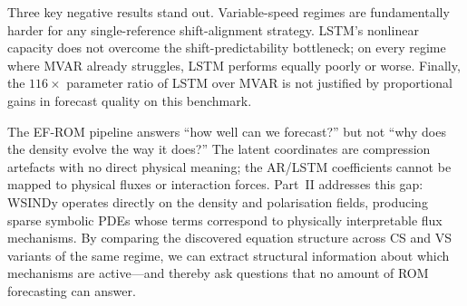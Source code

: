 Three key negative results stand out.
Variable-speed regimes are fundamentally harder for any
single-reference shift-alignment strategy.
LSTM's nonlinear capacity does not overcome the shift-predictability
bottleneck; on every regime where MVAR already struggles, LSTM
performs equally poorly or worse.
Finally, the $116\times$ parameter ratio of LSTM over MVAR
is not justified by proportional gains
in forecast quality on this benchmark.

\label{sec:ch7_transition}
The EF-ROM pipeline answers ``how well can we forecast?'' but not ``why
does the density evolve the way it does?''  The latent coordinates are
compression artefacts with no direct physical meaning; the AR/LSTM
coefficients cannot be mapped to physical fluxes or interaction forces.
Part~II addresses this gap: WSINDy operates directly on the density and
polarisation fields, producing sparse symbolic PDEs whose terms correspond
to physically interpretable flux mechanisms.  By comparing the discovered
equation structure across CS and VS variants of the same regime, we can
extract structural information about which mechanisms are active---and
thereby ask questions that no amount of ROM forecasting can answer.
